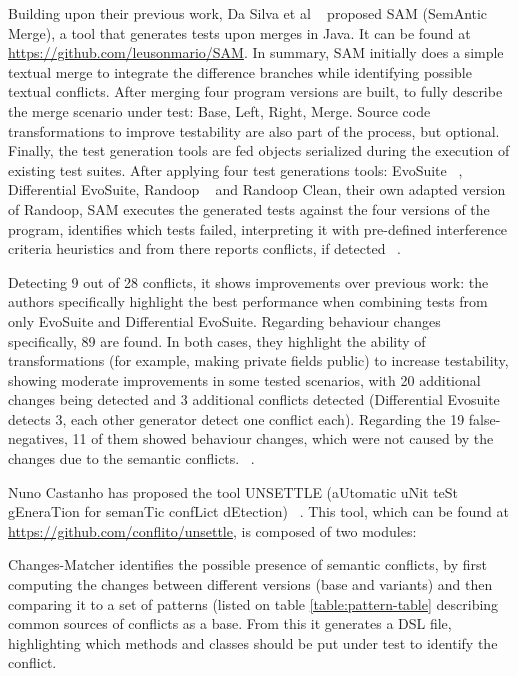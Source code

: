  Building upon their previous work, Da Silva et al ~\citep{kn:leuson2} proposed SAM (SemAntic Merge), a tool that generates tests upon merges in Java. It can be found at \url{https://github.com/leusonmario/SAM}. In summary, SAM initially does a simple textual merge to integrate the difference branches while identifying possible textual conflicts. After merging four program versions are built, to fully describe the merge scenario under test: Base, Left, Right, Merge. Source code transformations to improve testability are also part of the process, but optional. Finally, the test generation tools are fed objects serialized during the execution of existing test suites. After applying four test generations tools: EvoSuite ~\citep{kn:evosuite}, Differential EvoSuite, Randoop ~\citep{kn:randoop} and Randoop Clean, their own adapted version of Randoop, SAM executes the generated tests against the four versions of the program, identifies which tests failed, interpreting it with pre-defined interference criteria heuristics and from there reports conflicts, if detected ~\citep{kn:leuson2}.

Detecting 9 out of 28 conflicts, it shows improvements over previous work: the authors specifically highlight the best performance when combining tests from only EvoSuite and Differential EvoSuite. Regarding behaviour changes specifically, 89 are found. 
In both cases, they highlight the ability of transformations (for example, making private fields public) to increase testability, showing moderate improvements in some tested scenarios, with 20 additional changes being detected and 3 additional conflicts detected (Differential Evosuite detects 3, each other generator detect one conflict each).  Regarding the 19 false-negatives, 11 of them showed behaviour changes, which were not caused by the changes due to the semantic conflicts.  ~\citep{kn:leuson2}.


Nuno Castanho has proposed the tool UNSETTLE (aUtomatic uNit teSt gEneraTion for semanTic confLict dEtection) ~\citep{kn:nuno}. This tool, which can be found at \url{https://github.com/conflito/unsettle}, is composed of two modules:

Changes-Matcher identifies the possible presence of semantic conflicts, by first computing the changes between different versions (base and variants) and then comparing it to a set of patterns (listed on table \ref{table:pattern-table} describing common sources of conflicts as a base. From this it generates a DSL file, highlighting which methods and classes should be put under test to identify the conflict.

